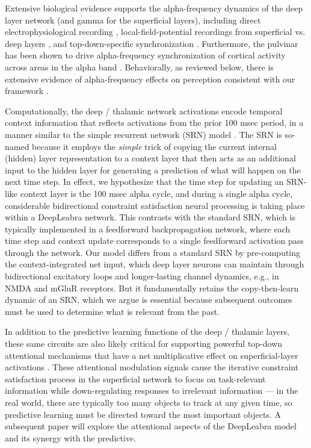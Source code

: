 \documentclass[11pt,twoside]{article}
\newif\myifpdf
\begin{document}
Extensive biological evidence supports the alpha-frequency dynamics of the deep layer network (and gamma for the superficial layers), including direct electrophysiological recording \cite{LuczakBarthoHarris13}, local-field-potential recordings from superficial vs. deep layers \cite{BuffaloFriesLandmanEtAl11,MaierAdamsAuraEtAl10,MaierAuraLeopold11,SpaakBonnefondMaierEtAl12,XingYehBurnsEtAl12,BastosVezoliBosmanEtAl15,MichalareasVezolivanPeltEtAl16}, and top-down-specific synchronization \cite{vonSteinChiangKonig00,vanKerkoerleSelfDagninoEtAl14}.  Furthermore, the pulvinar has been shown to drive alpha-frequency synchronization of cortical activity across areas in the alpha band \cite{SaalmannPinskWangEtAl12}.  Behaviorally, as reviewed below, there is extensive evidence of alpha-frequency effects on perception consistent with our framework  \cite{NunnOsselton74,VarelaToroJohnEtAl81,VanRullenKoch03,JensenBonnefondVanRullen12}.

Computationally, the deep / thalamic network activations encode temporal context information that reflects activations from the prior 100 msec period, in a manner similar to the simple recurrent network (SRN) model \cite{Elman90,Elman91,Jordan89}.  The SRN is so-named because it employs the {\em simple} trick of copying the current internal (hidden) layer representation to a context layer that then acts as an additional input to the hidden layer for generating a prediction of what will happen on the next time step.  In effect, we hypothesize that the time step for updating an SRN-like context layer is the 100 msec alpha cycle, and during a single alpha cycle, considerable bidirectional constraint satisfaction neural processing is taking place within a DeepLeabra network.  This contrasts with the standard SRN, which is typically implemented in a feedforward backpropagation network, where each time step and context update corresponds to a single feedforward activation pass through the network.  Our model differs from a standard SRN by pre-computing the context-integrated net input, which deep layer neurons can maintain through bidirectional excitatory loops and longer-lasting channel dynamics, e.g., in NMDA and mGluR receptors.  But it fundamentally retains the copy-then-learn dynamic of an SRN, which we argue is essential because subsequent outcomes must be used to determine what is relevant from the past.

In addition to the predictive learning functions of the deep / thalamic layers, these same circuits are also likely critical for supporting powerful top-down attentional mechanisms that have a net multiplicative effect on superficial-layer activations \cite{BortoneOlsenScanziani14,OlsenBortoneAdesnikEtAl12,BortoneOlsenScanziani14,OlsenBortoneAdesnikEtAl12}.  These attentional modulation signals cause the iterative constraint satisfaction process in the superficial network to focus on task-relevant information while down-regulating responses to irrelevant information --- in the real world, there are typically too many objects to track at any given time, so predictive learning must be directed toward the most important objects. A subsequent paper will explore the attentional aspects of the DeepLeabra model and its synergy with the predictive.
\end{document}

